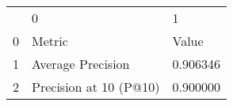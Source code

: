 \begin{tabular}{lll}
 & 0 & 1 \\
0 & Metric & Value \\
1 & Average Precision & 0.906346 \\
2 & Precision at 10 (P@10) & 0.900000 \\
\end{tabular}

